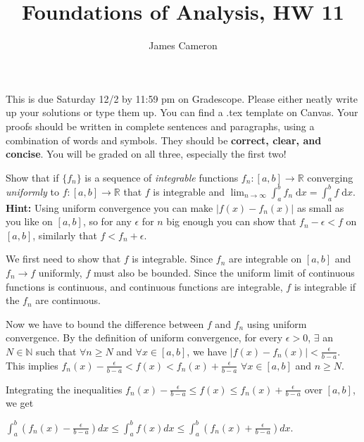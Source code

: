 \documentclass[answers]{exam}
\title{Foundations of Analysis, HW 11}
\author{James Cameron}
\date{}
\theoremstyle{remark}
\theoremstyle{definition}
\newcommand{\NN}{\mathbb{N}}
\newcommand{\RR}{\mathbb{R}}
\newcommand{\dx}{\;\mathrm{d}x}
\begin{document}



 This is due Saturday 12/2 by 11:59 pm on Gradescope. Please either neatly write up your solutions or type them up. You can find a .tex template on Canvas. Your proofs should be written in complete sentences and paragraphs, using a combination of words and symbols. They should be \textbf{correct, clear, and concise}. You will be graded on all three, especially the first two!

\noindent


\begin{questions}

\question [4] Show that if $\{f_n\}$ is a sequence of \emph{integrable} functions $f_n: [a,b] \to \RR$ converging \emph{uniformly} to $f: [a,b] \to \RR$ that $f$ is integrable and $\lim_{n \to \infty} \int_a^b f_n \dx= \int_a^b f \dx$. \textbf{Hint:} Using uniform convergence you can make $|f(x)-f_n(x)|$ as small as you like on $[a,b]$, so for any $\epsilon$ for $n$ big enough you can show that $f_n - \epsilon < f$ on $[a,b]$, similarly that $f< f_n + \epsilon$.

\begin{solution}

We first need to show that $f$ is integrable. Since $f_n$ are integrable on $[a, b]$
and $f_n \to f$ uniformly, $f$ must also be bounded. Since the uniform
limit of continuous functions is continuous, and continuous functions are integrable,
$f$ is integrable if the $f_n$ are continuous.

Now we have to bound the difference between $f$ and $f_n$ using uniform
convergence. By the definition of uniform convergence, for every $\epsilon > 0$,
$\exists$ an $N \in \NN$ such that $\forall n \geq N$ and $\forall x \in [a, b]$,
we have $|f(x) - f_n(x)| < \frac{\epsilon}{b-a}$.
This implies $f_n(x) - \frac{\epsilon}{b-a} < f(x) < f_n(x) + \frac{\epsilon}{b-a}$
$\forall x \in [a, b]$ and $n \geq N$.

Integrating the inequalities
$f_n(x) - \frac{\epsilon}{b-a} \leq f(x) \leq f_n(x) + \frac{\epsilon}{b-a}$
over $[a, b]$, we get

$\int_{a}^{b} (f_n(x) - \frac{\epsilon}{b-a}) dx \leq \int_{a}^{b} f(x) dx \leq \int_{a}^{b} (f_n(x) + \frac{\epsilon}{b-a}) dx$.


\end{solution}
\end{questions}
\end{document}
